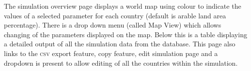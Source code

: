 
The simulation overview page displays a world map using colour to indicate the values of a selected parameter for each country (default is arable land area percentage). There is a drop down menu (called Map View) which allows changing of the parameters displayed on the map. Below this is a table displaying a detailed output of all the simulation data from the database. This page also links to the \textsc{csv} export feature, copy feature, edit simulation page and a dropdown is present to allow editing of all the countries within the simulation.
